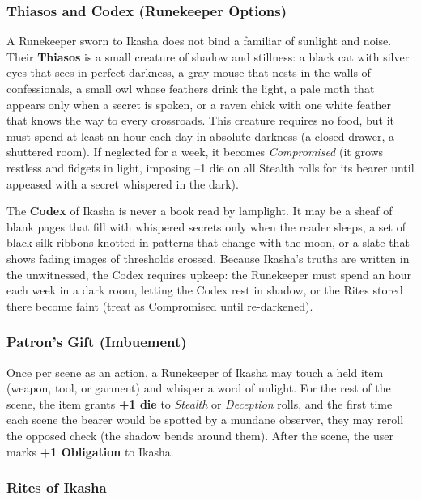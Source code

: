 \subsubsection*{Thiasos and Codex (Runekeeper Options)}

A Runekeeper sworn to Ikasha does not bind a familiar of sunlight and noise. Their \textbf{Thiasos} is a small creature of shadow and stillness: a black cat with silver eyes that sees in perfect darkness, a gray mouse that nests in the walls of confessionals, a small owl whose feathers drink the light, a pale moth that appears only when a secret is spoken, or a raven chick with one white feather that knows the way to every crossroads. This creature requires no food, but it must spend at least an hour each day in absolute darkness (a closed drawer, a shuttered room). If neglected for a week, it becomes \textit{Compromised} (it grows restless and fidgets in light, imposing --1 die on all Stealth rolls for its bearer until appeased with a secret whispered in the dark).

The \textbf{Codex} of Ikasha is never a book read by lamplight. It may be a sheaf of blank pages that fill with whispered secrets only when the reader sleeps, a set of black silk ribbons knotted in patterns that change with the moon, or a slate that shows fading images of thresholds crossed. Because Ikasha's truths are written in the unwitnessed, the Codex requires upkeep: the Runekeeper must spend an hour each week in a dark room, letting the Codex rest in shadow, or the Rites stored there become faint (treat as Compromised until re-darkened).

\subsubsection*{Patron's Gift (Imbuement)}

Once per scene as an action, a Runekeeper of Ikasha may touch a held item (weapon, tool, or garment) and whisper a word of unlight. For the rest of the scene, the item grants \textbf{+1 die} to \textit{Stealth} or \textit{Deception} rolls, and the first time each scene the bearer would be spotted by a mundane observer, they may reroll the opposed check (the shadow bends around them). After the scene, the user marks \textbf{+1 Obligation} to Ikasha.

\subsubsection*{Rites of Ikasha}

